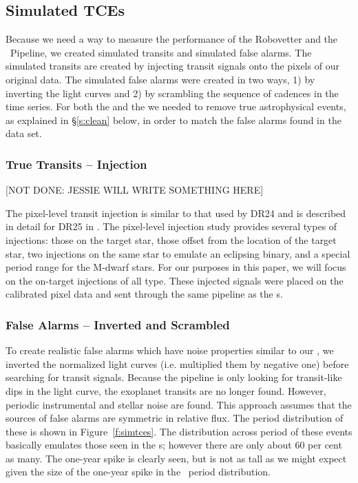 \subsection{Simulated TCEs}
\label{s:simulated}
Because we need a way to measure the performance of the Robovetter and the \Kepler\ Pipeline, we created simulated transits and simulated false alarms. The simulated transits are created by injecting transit signals onto the pixels of our original data.  The simulated false alarms were created in two ways, 1) by inverting the light curves and 2) by scrambling the sequence of cadences in the time series.  For both the  and the  we needed to remove true astrophysical events, as explained in \S\ref{s:clean} below, in order to match the false alarms found in the \opstce data set.


\subsubsection{True Transits -- Injection}
\label{injectsec}
[NOT DONE: JESSIE WILL WRITE SOMETHING HERE\newline]

The pixel-level transit injection is similar to that used by DR24 \citep{Christiansen2016} and is described in detail for DR25 in \citep{Christiansen2017}. The pixel-level injection study provides several types of injections: those on the target star, those offset from the location of the target star, two injections on the same star to emulate an eclipsing binary, and a special period range for the M-dwarf stars.  For our purposes in this paper, we will focus on the on-target injections of all type.  These injected signals were placed on the calibrated pixel data and sent through the same \Kepler{} pipeline as the \opstce s.


\subsubsection{False Alarms -- Inverted and Scrambled} 

To create realistic false alarms which have noise properties similar to our , we inverted the normalized light curves (i.e. multiplied them by negative one) before searching for transit signals.  Because the pipeline is only looking for transit-like dips in the light curve, the exoplanet transits are no longer found. However, periodic instrumental and stellar noise are found. This approach assumes that the sources of false alarms are symmetric in relative flux. The period distribution of these  is shown in Figure~\ref{f:simtces}. The distribution across period of these events basically emulates those seen in the \opstce s; however there are only about 60 per cent as many.  The one-year spike is clearly seen, but is not as tall as we might expect given the size of the one-year spike in the \opstce\ period distribution. 

